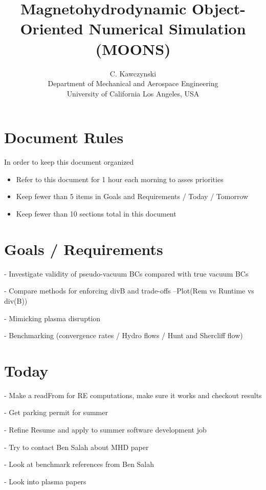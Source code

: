 \documentclass[11pt]{article}
\begin{document}
\doublespacing
\title{Magnetohydrodynamic Object-Oriented Numerical Simulation (MOONS)}
\author{C. Kawczynski \\
Department of Mechanical and Aerospace Engineering \\
University of California Los Angeles, USA\\
}
\maketitle

\section{Document Rules}
In order to keep this document organized
\begin{itemize}
\item Refer to this document for 1 hour each morning to asses priorities
\item Keep fewer than 5 items in Goals and Requirements / Today / Tomorrow
\item Keep fewer than 10 sections total in this document
\end{itemize}

\section{Goals / Requirements}

- Investigate validity of pseudo-vacuum BCs compared with true vacuum BCs

- Compare methods for enforcing divB and trade-offs
--Plot(Rem vs Runtime vs div(B))

- Mimicking plasma disruption

- Benchmarking (convergence rates / Hydro flows / Hunt and Shercliff flow)


\section{Today}

- Make a readFrom for RE computations, make sure it works and checkout results

- Get parking permit for summer

- Refine Resume and apply to summer software development job

- Try to contact Ben Salah about MHD paper

- Look at benchmark references from Ben Salah

- Look into plasma papers
\end{document}

